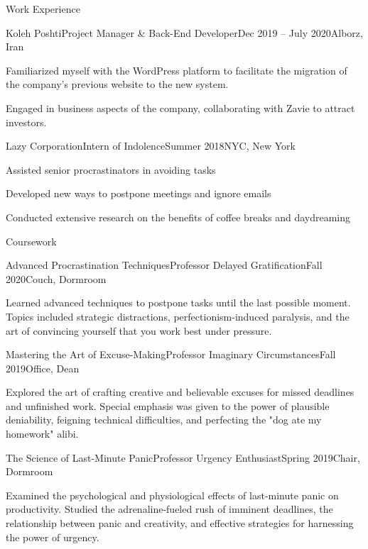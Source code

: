 \documentclass[]{kyvernitis-resume}
\begin{document}
\begin{section}{Work Experience}
\begin{subsection}{Koleh Poshti}{Project Manager \& Back-End Developer}{Dec 2019 -- July 2020}{Alborz, Iran}
	\item Familiarized myself with the WordPress platform to facilitate the migration of the company's previous website to the new system.

	\item Engaged in business aspects of the company, collaborating with Zavie to attract investors.
    \end{subsection}
    
    \begin{subsection}{Lazy Corporation}{Intern of Indolence}{Summer 2018}{NYC, New York}
        \item Assisted senior procrastinators in avoiding tasks
        \item Developed new ways to postpone meetings and ignore emails
        \item Conducted extensive research on the benefits of coffee breaks and daydreaming
    \end{subsection}
    
\end{section}

\begin{section}{Coursework}
\begin{subsectionnobullet}{Advanced Procrastination Techniques}{Professor Delayed Gratification}{Fall 2020}{Couch, Dormroom}
    \item{Learned advanced techniques to postpone tasks until the last possible moment. Topics included strategic distractions, perfectionism-induced paralysis, and the art of convincing yourself that you work best under pressure.}
\end{subsectionnobullet}

\begin{subsectionnobullet}{Mastering the Art of Excuse-Making}{Professor Imaginary Circumstances}{Fall 2019}{Office, Dean}
    \item{Explored the art of crafting creative and believable excuses for missed deadlines and unfinished work. Special emphasis was given to the power of plausible deniability, feigning technical difficulties, and perfecting the "dog ate my homework" alibi.}
\end{subsectionnobullet}

\begin{subsectionnobullet}{The Science of Last-Minute Panic}{Professor Urgency Enthusiast}{Spring 2019}{Chair, Dormroom}
    \item{Examined the psychological and physiological effects of last-minute panic on productivity. Studied the adrenaline-fueled rush of imminent deadlines, the relationship between panic and creativity, and effective strategies for harnessing the power of urgency.}
\end{subsectionnobullet}

\end{section}
\end{document}
